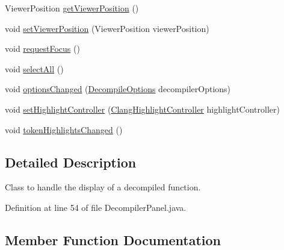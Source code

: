 \begin{DoxyCompactItemize}
\item 
Viewer\+Position \mbox{\hyperlink{classghidra_1_1app_1_1decompiler_1_1component_1_1_decompiler_panel_aa744d25092cfdb8870d8b8af7837bfcf}{get\+Viewer\+Position}} ()
\item 
void \mbox{\hyperlink{classghidra_1_1app_1_1decompiler_1_1component_1_1_decompiler_panel_abf24052df7a28395b3151b87f991e5a1}{set\+Viewer\+Position}} (Viewer\+Position viewer\+Position)
\item 
void \mbox{\hyperlink{classghidra_1_1app_1_1decompiler_1_1component_1_1_decompiler_panel_a340360330f720fc888ef2de5ffea0a7b}{request\+Focus}} ()
\item 
void \mbox{\hyperlink{classghidra_1_1app_1_1decompiler_1_1component_1_1_decompiler_panel_a316699fe182bafdb7fcbe0e19a08e962}{select\+All}} ()
\item 
void \mbox{\hyperlink{classghidra_1_1app_1_1decompiler_1_1component_1_1_decompiler_panel_ad34eb82dfc3a0760d3ed82097d0fb1df}{options\+Changed}} (\mbox{\hyperlink{classghidra_1_1app_1_1decompiler_1_1_decompile_options}{Decompile\+Options}} decompiler\+Options)
\item 
void \mbox{\hyperlink{classghidra_1_1app_1_1decompiler_1_1component_1_1_decompiler_panel_a5b356eadb37bd9994342354b8821d523}{set\+Highlight\+Controller}} (\mbox{\hyperlink{classghidra_1_1app_1_1decompiler_1_1component_1_1_clang_highlight_controller}{Clang\+Highlight\+Controller}} highlight\+Controller)
\item 
void \mbox{\hyperlink{classghidra_1_1app_1_1decompiler_1_1component_1_1_decompiler_panel_ac71275c734f1c34324845ed73ae91929}{token\+Highlights\+Changed}} ()
\end{DoxyCompactItemize}


\subsection{Detailed Description}
Class to handle the display of a decompiled function. 

Definition at line 54 of file Decompiler\+Panel.\+java.



\subsection{Member Function Documentation}
\mbox{\label{classghidra_1_1app_1_1decompiler_1_1component_1_1_decompiler_panel_a19c6d21a4fa34c95ae27816ffe2fa5aa}} 
